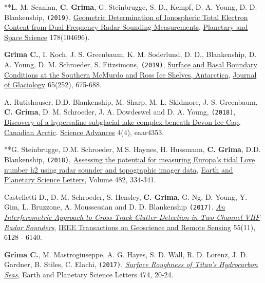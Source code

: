 \begin{etaremune}
\item
  **L. M. Scanlan, \textbf{C. Grima}, G. Steinbrugge, S. D., Kempf, D. A. Young, D. D. Blankenship, \texttt{(2019)}, \href{https://www.sciencedirect.com/science/article/pii/S0032063319300820}{Geometric Determination of Ionospheric Total Electron Content from Dual Frequency Radar Sounding Measurements}, \ul{Planetary and Space Science} 178(104696).
\item
  \textbf{Grima C.}, I. Koch, J. S. Greenbaum, K. M. Soderlund, D. D., Blankenship, D. A. Young, D. M. Schroeder, S. Fitzsimons, \texttt{(2019)}, \href{https://www.cambridge.org/core/journals/journal-of-glaciology/article/surface-and-basal-boundary-conditions-at-the-southern-mcmurdo-and-ross-ice-shelves-antarctica/3ED3BFD465A3F6A5FC48342694F91EC5}{Surface and Basal Boundary Conditions at the Southern McMurdo and Ross Ice Shelves, Antarctica}, \ul{Journal of Glaciology} 65(252), 675-688.
\item
  A. Rutishauser, D.D. Blankenship, M. Sharp, M. L.
  Skidmore, J. S. Greenbaum, \textbf{C. Grima}, D. M. Schroeder, J. A.
  Dowdeswel and D. A. Young, \texttt{(2018)},
  \href{http://advances.sciencemag.org/content/4/4/eaar4353}{Discovery
  of a hypersaline subglacial lake complex beneath Devon Ice Cap,
  Canadian Arctic}. \ul{Science Advances} 4(4), eaar4353.
\item
  **G. Steinbrugge, D.M. Schroeder, M.S. Haynes, H. Hussmann,
  \textbf{C. Grima}, D.D. Blankenship, \texttt{(2018)},
  \href{https://www.sciencedirect.com/science/article/pii/S0012821X17306647}{Assessing
  the potential for measuring Europa's tidal Love number h2 using radar
  sounder and topographic imager data}, \ul{Earth and Planetary Science
  Letters}, Volume 482, 334-341.
\item
  Castelletti D., D. M. Schroeder, S. Hensley, \textbf{C. Grima}, G. Ng,
  D. Young, Y. Gim, L. Bruzzone, A. Moussessian and D. D. Blankenship
  \texttt{(2017)}.
  \href{http://ieeexplore.ieee.org/abstract/document/8012547/}{\emph{An
  Interferometric Approach to Cross-Track Clutter Detection in Two
  Channel VHF Radar Sounders}}, \ul{IEEE Transactions on Geoscience and
  Remote Sensing} 55(11), 6128 - 6140.
\item
  \textbf{Grima C.}, M. Mastrogiuseppe, A. G. Hayes, S. D. Wall, R. D.
  Lorenz, J. D. Gardner, B. Stiles, C. Elachi, \texttt{(2017)},
  \href{http://www.sciencedirect.com/science/article/pii/S0012821X17303163}{\emph{Surface
  Roughness of Titan's Hydrocarbon Seas}}, Earth and Planetary Science
  Letters 474, 20-24.
\item

\end{etaremune}
